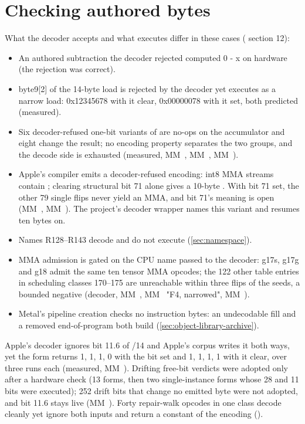 \section{Checking authored bytes}\label{sec:admission-decodes-executes}

What the decoder accepts and what executes differ in these cases ( section 12):

\begin{itemize}
\item An authored subtraction the decoder rejected computed 0 - x on hardware (the rejection was correct).
\item byte9{[}2{]} of the 14-byte load is rejected by the decoder yet executes as a narrow load: 0x12345678 with it clear,
  0x00000078 with it set, both predicted (measured).
\item Six decoder-refused one-bit variants of  are no-ops on the accumulator and eight change the result; no encoding
  property separates the two groups, and the decode side is exhausted (measured, MM~, MM~, MM~).
\item Apple's compiler emits a decoder-refused encoding: int8 MMA streams contain ; clearing structural
  bit 71 alone gives a 10-byte . With bit 71 set, the other 79 single flips
  never yield an MMA, and bit 71's meaning is open (MM~, MM~). The project's decoder wrapper names this variant
  and resumes ten bytes on.
\item Names R128–R143 decode and do not execute (\cref{sec:namespace}).
\item MMA admission is gated on the CPU name passed to the decoder: g17s, g17g and g18 admit the same ten tensor MMA opcodes;
  the 122 other table entries in scheduling classes 170–175 are unreachable within three flips of the seeds, a bounded
  negative (decoder, MM~, MM~ "F4, narrowed", MM~).
\item Metal's pipeline creation checks no instruction bytes: an undecodable  fill and a removed end-of-program both
  build (\cref{sec:object-library-archive}).
\end{itemize}

Apple's decoder ignores bit 11.6 of /14 and Apple's corpus writes it both ways, yet the form returns 1, 1, 1, 0
with the bit set and 1, 1, 1, 1 with it clear, over three runs each (measured, MM~). Drifting free-bit verdicts
were adopted only after a hardware check (13 forms, then two single-instance forms whose 28 and 11 bits were executed);
252 drift bits that change no emitted byte were not adopted, and bit 11.6 stays live (MM~). Forty repair-walk opcodes in one class
decode cleanly yet ignore both inputs and return a constant of the encoding
().

